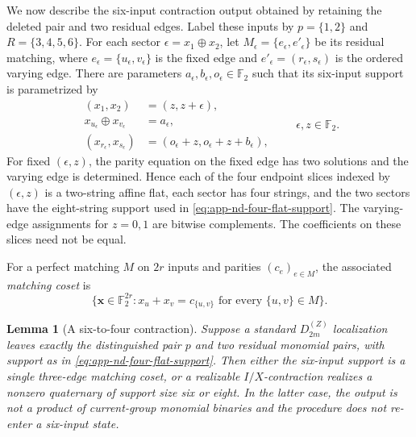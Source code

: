 \documentclass[11pt,letterpaper,onecolumn]{article}
\theoremstyle{plain}
\newtheorem{lemma}[lemma]{Lemma}
\theoremstyle{definition}
\theoremstyle{remark}
\newcommand{\Ftwo}{\mathbb F_2}
\newcommand{\DihZ}[1]{{D_{#1}^{(Z)}}}
\begin{document}
We now describe the six-input contraction output obtained by retaining
the deleted pair and two residual edges. Label these inputs by
\(p=\{1,2\}\) and \(R=\{3,4,5,6\}\).  For each sector
\(\epsilon=x_1\oplus x_2\), let
\(M_\epsilon=\{e_\epsilon,e'_\epsilon\}\) be its residual matching, where
\(e_\epsilon=\{u_\epsilon,v_\epsilon\}\) is the fixed edge and
\(e'_\epsilon=(r_\epsilon,s_\epsilon)\) is the ordered varying edge.  There
are parameters \(a_\epsilon,b_\epsilon,o_\epsilon\in\Ftwo\) such that its
six-input support is parametrized by
\begin{equation}
 \begin{aligned}
 (x_1,x_2)&=(z,z+\epsilon),\\
 x_{u_\epsilon}\oplus x_{v_\epsilon}&=a_\epsilon,\\
 (x_{r_\epsilon},x_{s_\epsilon})
   &=(o_\epsilon+z,o_\epsilon+z+b_\epsilon),
 \end{aligned}
 \qquad \epsilon,z\in\Ftwo.
 \label{eq:app-nd-four-flat-support}
\end{equation}
For fixed \((\epsilon,z)\), the parity equation on the fixed edge has two
solutions and the varying edge is determined.  Hence each of the four
endpoint slices indexed by \((\epsilon,z)\) is a two-string affine flat, each
sector has four strings, and the two sectors have the eight-string support used
in \cref{eq:app-nd-four-flat-support}.  The varying-edge assignments for
\(z=0,1\) are bitwise complements.  The coefficients on these slices need not be equal.

For a perfect matching \(M\) on \(2r\) inputs and parities
\((c_e)_{e\in M}\), the associated \emph{matching coset} is
\[
 \{{\mathbf{x}}\in\Ftwo^{2r}:x_u+x_v=c_{\{u,v\}}
       \text{ for every }\{u,v\}\in M\}.
\]

\begin{lemma}[A six-to-four contraction]
\label{lem:app-nd-six-to-four}
Suppose a standard \(\DihZ{2m}\) localization leaves exactly the distinguished
pair \(p\) and two residual monomial pairs, with support as in \cref{eq:app-nd-four-flat-support}.  Then either the six-input support is a single three-edge
matching coset, or a realizable \(I/X\)-contraction realizes a nonzero
quaternary of support size six or eight.  In the latter case, the output is
not a product of current-group monomial binaries and the procedure does not
re-enter a six-input state.
\end{lemma}
\end{document}
